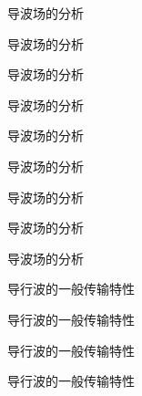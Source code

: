 \documentclass{beamer}
\begin{document}
\begin{frame}{导波场的分析}

\end{frame}

\begin{frame}{导波场的分析}

\end{frame}

\begin{frame}{导波场的分析}

\end{frame}

\begin{frame}{导波场的分析}

\end{frame}

\begin{frame}{导波场的分析}

\end{frame}

\begin{frame}{导波场的分析}

\end{frame}

\begin{frame}{导波场的分析}

\end{frame}

\begin{frame}{导波场的分析}

\end{frame}

\begin{frame}{导波场的分析}

\end{frame}

\begin{frame}{导行波的一般传输特性}

\end{frame}

\begin{frame}{导行波的一般传输特性}

\end{frame}

\begin{frame}{导行波的一般传输特性}

\end{frame}

\begin{frame}{导行波的一般传输特性}

\end{frame}
\end{document}

